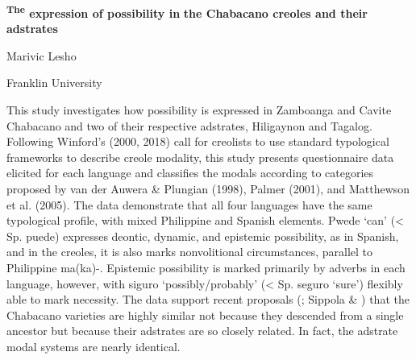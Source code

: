 \documentclass[output=paper]{langsci/langscibook}
\author{\affiliation{}\orcid{}}
\title{}
\begin{document}
\maketitle 


\begin{stylelsAbstract}
\textbf{\textup{\textsuperscript{The} \textbf{expression} \textbf{of} \textbf{possibility} \textbf{in} }}\textbf{\textup{the} \textbf{Chabacano} \textbf{creoles} \textbf{and} \textbf{their} \textbf{adstrates} }
\end{stylelsAbstract}

\begin{stylelsAbstract}
\textup{Marivic Lesho}
\end{stylelsAbstract}

\begin{stylelsAbstract}
\textup{Franklin University}
\end{stylelsAbstract}

\begin{stylelsAbstract}
\textup{This study investigates how possibility is expressed in Zamboanga and Cavite Chabacano and two of their respective adstrates, Hiligaynon and Tagalog. Following} \textup{W}\textup{inford's (2000, 2018)} \textup{call for creolists to use standard typological frameworks to describe creole modality, this study presents questionnaire data elicited for each language and classifies the modals according to categories proposed by} \textup{v}\textup{an der Auwera \& Plungian (1998}), \textup{P}\textup{almer (2001}\textup{), and} \textup{M}\textup{atthewson et al. (2005}\textup{). The data demonstrate that all four languages have the same typological profile, with mixed Philippine and Spanish elements.} Pwede \textup{‘can’ (< Sp.} puede) \textup{expresses deontic, dynamic, and epistemic possibility, as in Spanish, and in the creoles, it is also marks nonvolitional circumstances, parallel to Philippine} ma(ka)-\textup{. Epistemic possibility is marked primarily by adverbs in each language, however, with} siguro \textup{‘possibly/probably’ (< Sp.} seguro \textup{‘sure’) flexibly able to mark necessity. The data support recent proposals} (\textup{\citealt{Fernández2006,2012a2006};} \textup{S}\textup{ippola \& \citealt{Lesho2020})} \textup{that the Chabacano varieties are highly similar not because they descended from a single ancestor but because their adstrates are so closely related. In fact, the adstrate modal systems are nearly identical.}
\end{stylelsAbstract}
\end{document}
